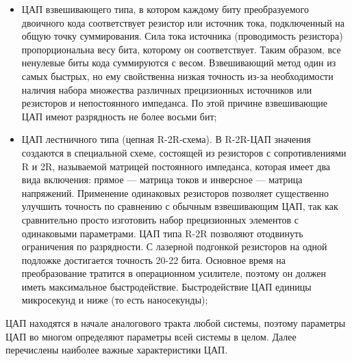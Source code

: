\begin{itemize}
\item ЦАП взвешивающего типа, в котором каждому биту преобразуемого двоичного кода соответствует резистор или источник тока, подключенный на общую точку суммирования. Сила тока источника (проводимость резистора) пропорциональна весу бита, которому он соответствует. Таким образом, все ненулевые биты кода суммируются с весом. Взвешивающий метод один из самых быстрых, но ему свойственна низкая точность из-за необходимости наличия набора множества различных прецизионных источников или резисторов и непостоянного импеданса. По этой причине взвешивающие ЦАП имеют разрядность не более восьми бит;

\item ЦАП лестничного типа (цепная R-2R-схема). В R-2R-ЦАП значения создаются в специальной схеме, состоящей из резисторов с сопротивлениями R и 2R, называемой матрицей постоянного импеданса, которая имеет два вида включения: прямое --- матрица токов и инверсное --- матрица напряжений. Применение одинаковых резисторов позволяет существенно улучшить точность по сравнению с обычным взвешивающим ЦАП, так как сравнительно просто изготовить набор прецизионных элементов с одинаковыми параметрами. ЦАП типа R-2R позволяют отодвинуть ограничения по разрядности. С лазерной подгонкой резисторов на одной подложке достигается точность 20-22 бита. Основное время на преобразование тратится в операционном усилителе, поэтому он должен иметь максимальное быстродействие. Быстродействие ЦАП единицы микросекунд и ниже (то есть наносекунды);
\end{itemize}

ЦАП находятся в начале аналогового тракта любой системы, поэтому параметры ЦАП во многом определяют параметры всей системы в целом. Далее перечислены наиболее важные характеристики ЦАП.

